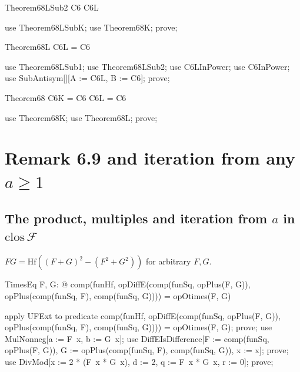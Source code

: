 \documentclass{article}
\begin{document}
\begin{theorem}{Theorem68LSub2}
  C6 \subseteq C6L
\end{theorem}

\begin{zproof}
use Theorem68LSubK;
use Theorem68K;
prove;
\end{zproof}

\begin{theorem}{Theorem68L}
  C6L = C6
\end{theorem}

\begin{zproof}
use Theorem68LSub1;
use Theorem68LSub2;
use C6LInPower;
use C6InPower;
use SubAntisym[\nat \fun \nat][A := C6L, B := C6];
prove;
\end{zproof}

\begin{theorem}{Theorem68}
  C6K = C6 \land C6L = C6
\end{theorem}

\begin{zproof}
use Theorem68K;
use Theorem68L;
prove;
\end{zproof}

\section{Remark 6.9 and iteration from any $a \ge 1$}

\subsection{The product, multiples and iteration from $a$ in $\mathrm{clos}\,\mathcal{F}$}

$FG = \mathrm{Hf}((F+G)^2 - (F^2 + G^2))$ for arbitrary $F, G$.

\begin{theorem}{TimesEq}
  \forall F, G: \nat \fun \nat @ comp(funHf, opDiffE(comp(funSq, opPlus(F, G)), opPlus(comp(funSq, F), comp(funSq, G)))) = opOtimes(F, G)
\end{theorem}

\begin{zproof}
apply UFExt to predicate comp(funHf, opDiffE(comp(funSq, opPlus(F, G)), opPlus(comp(funSq, F), comp(funSq, G)))) = opOtimes(F, G);
prove;
use MulNonneg[a := F~x, b := G~x];
use DiffEIsDifference[F := comp(funSq, opPlus(F, G)), G := opPlus(comp(funSq, F), comp(funSq, G)), x := x];
prove;
use DivMod[x := 2 * (F~x * G~x), d := 2, q := F~x * G~x, r := 0];
prove;
\end{zproof}
\end{document}

